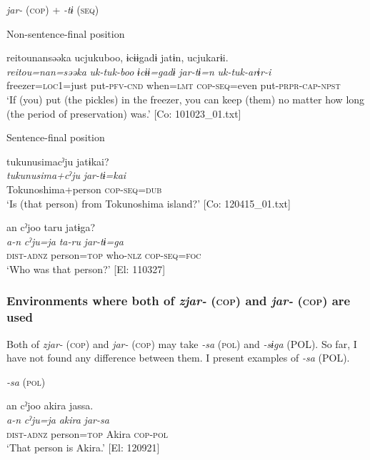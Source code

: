\ea\label{ex:8-44}
  \textit{jar-} (\textsc{cop}) + \textit{-tɨ} (\textsc{seq})

  Non-sentence-final position

\ea  {\TM}
\glll  {\textbar}reitou{\textbar}nansəəka  ucjukuboo,  ɨcɨɨgadɨ  jatɨn,      ucjukarɨi.\\
\textit{reitou=nan=səəka}  \textit{uk-tuk-boo}  \textit{ɨcɨɨ=gadɨ}  \textit{jar-tɨ=n}      \textit{uk-tuk-arɨr-i}\\
freezer=\textsc{loc}1=just  put-\textsc{pfv}-\textsc{cnd}  when=\textsc{lmt}  \textsc{cop}-\textsc{seq}=even  put-\textsc{prpr}-\textsc{cap}-\textsc{npst}\\
\glt ‘If (you) put (the pickles) in the freezer, you can keep (them) no matter how long (the period of preservation) was.’ [Co: 101023\_01.txt]

  Sentence-final position


\ex
{\TM}
\glll  tukunusimacˀju  jatɨkai?\\
\textit{tukunusima+cˀju}  \textit{jar-tɨ=kai}\\
Tokunoshima+person  \textsc{cop}-\textsc{seq}=\textsc{dub}\\
\glt ‘Is (that person) from Tokunoshima island?’ [Co: 120415\_01.txt]


\ex  {\TM}
\glll  an  cˀjoo  taru  jatɨga?\\
\textit{a-n}  \textit{cˀju=ja}  \textit{ta-ru}  \textit{jar-tɨ=ga}\\
\textsc{dist}-\textsc{adnz}  person=\textsc{top}  who-\textsc{nlz}  \textsc{cop}-\textsc{seq}=\textsc{foc}\\
\glt ‘Who was that person?’ [El: 110327]
\z
\z

\subsubsection{Environments where both of \textit{zjar-} (\textsc{cop}) and \textit{jar-} (\textsc{cop}) are used}

Both of \textit{zjar-} (\textsc{cop}) and \textit{jar-} (\textsc{cop}) may take \textit{-sa} (\textsc{pol}) and \textit{-sɨga} (POL). So far, I have not found any difference between them. I present examples of \textit{-sa} (POL).

\ea\label{ex:8-45}
\textit{-sa} (\textsc{pol})

\ea
{\TM}
\glll  an  cˀjoo  akira  jassa.\\
\textit{a-n}  \textit{cˀju=ja}  \textit{akira}  \textit{jar-sa}\\
\textsc{dist}-\textsc{adnz}  person=\textsc{top}  Akira  \textsc{cop}-\textsc{pol}\\
\glt ‘That person is Akira.’ [El: 120921]


